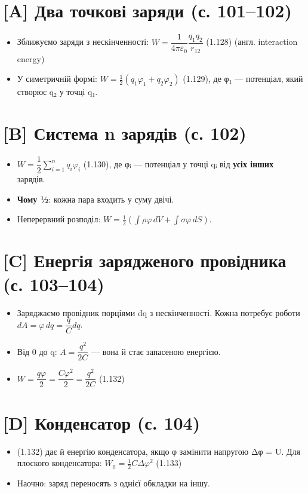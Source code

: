 \documentclass[11pt,a4paper,oneside]{book}
\begin{document}
\section*{[A] Два точкові заряди (с. 101–102)}
\begin{itemize}
\item Зближуємо заряди з нескінченності: $W = \dfrac{1}{4\pi\varepsilon_0}\dfrac{q_1q_2}{r_{12}}$ (1.128) (англ. interaction energy)
\item У симетричній формі: $W = \tfrac12(q_1\varphi_1 + q_2\varphi_2)$ (1.129), де φ₁ — потенціал, який створює q₂ у точці q₁.
\end{itemize}

\section*{[B] Система n зарядів (с. 102)}
\begin{itemize}
\item $W = \dfrac12\sum_{i=1}^n q_i\varphi_i$ (1.130), де φᵢ — потенціал у точці qᵢ від \textbf{усіх інших} зарядів.
\item \textbf{Чому ½}: кожна пара входить у суму двічі.
\item Неперервний розподіл: $W = \tfrac12\left(\int\rho\varphi\,dV + \int\sigma\varphi\,dS\right)$.
\end{itemize}

\section*{[C] Енергія зарядженого провідника (с. 103–104)}
\begin{itemize}
\item Заряджаємо провідник порціями dq з нескінченності. Кожна потребує роботи $dA = \varphi\,dq = \dfrac{q}{C}dq$.
\item Від 0 до q: $A = \dfrac{q^2}{2C}$ — вона й стає запасеною енергією.
\item $W = \dfrac{q\varphi}{2} = \dfrac{C\varphi^2}{2} = \dfrac{q^2}{2C}$ (1.132)
\end{itemize}

\section*{[D] Конденсатор (с. 104)}
\begin{itemize}
\item (1.132) дає й енергію конденсатора, якщо φ замінити напругою Δφ = U. Для плоского конденсатора: $W_\text{п} = \tfrac12C\Delta\varphi^2$ (1.133)
\item Наочно: заряд переносять з однієї обкладки на іншу.
\end{itemize}
\end{document}
